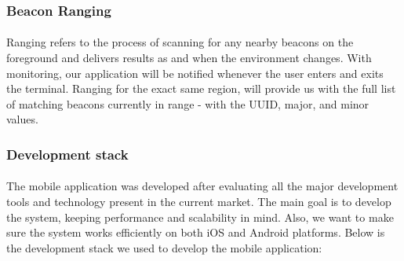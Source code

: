 \documentclass[12pt]{article}
\begin{document}
\subsubsection{Beacon Ranging}
\paragraph{} Ranging refers to the process of scanning for any nearby beacons on the foreground and delivers results as and when the environment changes. With monitoring, our application will be notified whenever the user enters and exits the terminal. Ranging for the exact same region, will provide us with the full list of matching beacons currently in range - with the UUID, major, and minor values.

\subsubsection{Development stack}
\paragraph{} The mobile application was developed after evaluating all the major development tools and technology present in the current market. The main goal is to develop the system, keeping performance and scalability in mind. Also, we want to make sure the system works efficiently on both iOS and Android platforms. Below is the development stack we used to develop the mobile application:
\end{document}
